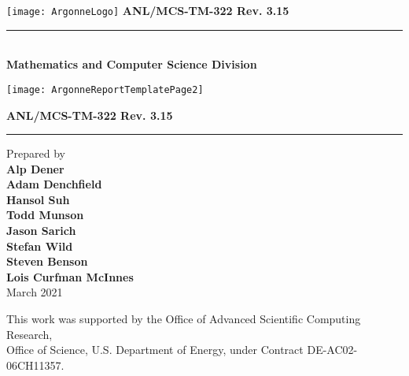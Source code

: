 
\pagestyle{empty}
\hspace{-.65in}\texttt{[image: ArgonneLogo]}
\hfill  {\large {\bf ANL/MCS-TM-322 Rev. 3.15}}

\vspace*{2in}
\vspace*{8pt}
\hrule
\vspace*{8pt}

\vspace*{1in}
\noindent \\
{\Large {\bf Mathematics and Computer Science Division}}

\vspace*{10pt}


\vspace*{20pt}


\newpage
{}
\centerline{\texttt{[image: ArgonneReportTemplatePage2]}}
\newpage
\restoregeometry


\pagestyle{empty}
\hfill {\large {\bf ANL/MCS-TM-322 Rev. 3.15}}

\vspace*{2in}
\vspace*{8pt}
\hrule
\vspace*{8pt}

\vspace*{0.5in}
\noindent Prepared by \\
{\bf Alp Dener \\ Adam Denchfield \\ Hansol Suh \\ Todd Munson \\ Jason Sarich \\ Stefan Wild \\ Steven Benson \\ Lois Curfman McInnes}\\

\vspace*{30pt}
\noindent March 2021

\vspace*{20pt}
\noindent This work was supported by the Office of Advanced Scientific Computing Research, \\
Office of Science, U.S. Department of Energy, under Contract DE-AC02-06CH11357.
